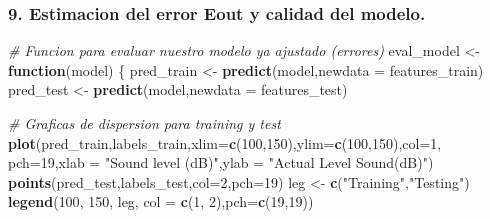 \documentclass[]{article}
\newenvironment{Shaded}{\begin{snugshade}}{\end{snugshade}}
\newcommand{\KeywordTok}[1]{\textcolor[rgb]{0.13,0.29,0.53}{\textbf{#1}}}
\newcommand{\DataTypeTok}[1]{\textcolor[rgb]{0.13,0.29,0.53}{#1}}
\newcommand{\DecValTok}[1]{\textcolor[rgb]{0.00,0.00,0.81}{#1}}
\newcommand{\StringTok}[1]{\textcolor[rgb]{0.31,0.60,0.02}{#1}}
\newcommand{\CommentTok}[1]{\textcolor[rgb]{0.56,0.35,0.01}{\textit{#1}}}
\newcommand{\ControlFlowTok}[1]{\textcolor[rgb]{0.13,0.29,0.53}{\textbf{#1}}}
\newcommand{\NormalTok}[1]{#1}
\begin{document}
\subsubsection{9. Estimacion del error Eout y calidad del
modelo.}\label{estimacion-del-error-eout-y-calidad-del-modelo.}

\begin{Shaded}
\begin{Highlighting}[]
\CommentTok{# Funcion para evaluar nuestro modelo ya ajustado (errores)}
\NormalTok{eval_model <-}\StringTok{ }\ControlFlowTok{function}\NormalTok{(model) \{}
\NormalTok{        pred_train <-}\StringTok{ }\KeywordTok{predict}\NormalTok{(model,}\DataTypeTok{newdata =}\NormalTok{ features_train)}
\NormalTok{        pred_test <-}\StringTok{ }\KeywordTok{predict}\NormalTok{(model,}\DataTypeTok{newdata =}\NormalTok{ features_test)}
        
        \CommentTok{# Graficas de dispersion para training y test}
        \KeywordTok{plot}\NormalTok{(pred_train,labels_train,}\DataTypeTok{xlim=}\KeywordTok{c}\NormalTok{(}\DecValTok{100}\NormalTok{,}\DecValTok{150}\NormalTok{),}\DataTypeTok{ylim=}\KeywordTok{c}\NormalTok{(}\DecValTok{100}\NormalTok{,}\DecValTok{150}\NormalTok{),}\DataTypeTok{col=}\DecValTok{1}\NormalTok{,}
             \DataTypeTok{pch=}\DecValTok{19}\NormalTok{,}\DataTypeTok{xlab =} \StringTok{"Sound level (dB)"}\NormalTok{,}\DataTypeTok{ylab =} \StringTok{"Actual Level Sound(dB)"}\NormalTok{)}
        \KeywordTok{points}\NormalTok{(pred_test,labels_test,}\DataTypeTok{col=}\DecValTok{2}\NormalTok{,}\DataTypeTok{pch=}\DecValTok{19}\NormalTok{) }
\NormalTok{        leg <-}\StringTok{ }\KeywordTok{c}\NormalTok{(}\StringTok{"Training"}\NormalTok{,}\StringTok{"Testing"}\NormalTok{)}
        \KeywordTok{legend}\NormalTok{(}\DecValTok{100}\NormalTok{, }\DecValTok{150}\NormalTok{, leg, }\DataTypeTok{col =} \KeywordTok{c}\NormalTok{(}\DecValTok{1}\NormalTok{, }\DecValTok{2}\NormalTok{),}\DataTypeTok{pch=}\KeywordTok{c}\NormalTok{(}\DecValTok{19}\NormalTok{,}\DecValTok{19}\NormalTok{))}
        

\end{Highlighting}
\end{Shaded}
\end{document}
